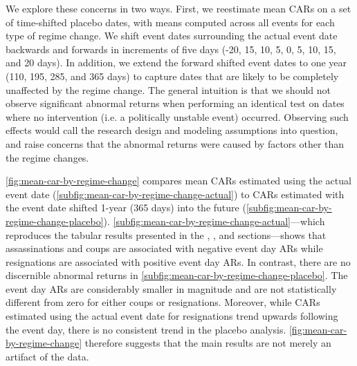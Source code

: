 \documentclass[12pt,final,fleqn]{article}
\theoremstyle{plain}
\begin{document}
We explore these concerns in two ways. First, we reestimate mean CARs on a set of time-shifted placebo dates, with means computed across all events for each type of regime change. We shift event dates surrounding the actual event date backwards and forwards in increments of five days (-20, 15, 10, 5, 0, 5, 10, 15, and 20 days). In addition, we extend the forward shifted event dates to one year (110, 195, 285, and 365 days) to capture dates that are likely to be completely unaffected by the regime change. The general intuition is that we should not observe significant abnormal returns when performing an identical test on dates where no intervention (i.e. a politically unstable event) occurred. Observing such effects would call the research design and modeling assumptions into question, and raise concerns that the abnormal returns were caused by factors other than the regime changes. 

\autoref{fig:mean-car-by-regime-change} compares mean CARs estimated using the actual event date (\autoref{subfig:mean-car-by-regime-change-actual}) to CARs estimated with the event date shifted 1-year (365 days) into the future (\autoref{subfig:mean-car-by-regime-change-placebo}). \autoref{subfig:mean-car-by-regime-change-actual}---which reproduces the tabular results presented in the , , and  sections---shows that assassinations and coups are associated with negative event day ARs while resignations are associated with positive event day ARs. In contrast, there are no discernible abnormal returns in \autoref{subfig:mean-car-by-regime-change-placebo}. The event day ARs are considerably smaller in magnitude and are not statistically different from zero for either coups or resignations. Moreover, while CARs estimated using the actual event date for resignations trend upwards following the event day, there is no consistent trend in the placebo analysis. \autoref{fig:mean-car-by-regime-change} therefore suggests that the main results are not merely an artifact of the data.  
\end{document}
